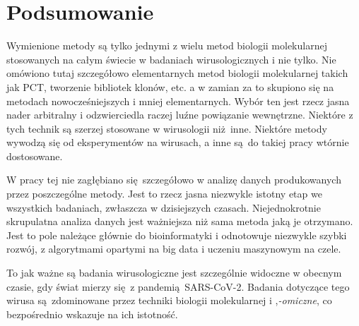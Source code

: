 \documentclass[two column, twoside, a4paper]{article}
\begin{document}
\section{Podsumowanie}

Wymienione metody są tylko jednymi z wielu metod biologii molekularnej stosowanych na całym świecie w badaniach wirusologicznych i nie tylko. Nie omówiono tutaj szczegółowo elementarnych metod biologii molekularnej takich jak PCT, tworzenie bibliotek klonów, etc. a w zamian za to skupiono się na metodach nowocześniejszych i mniej elementarnych. Wybór ten jest rzecz jasna nader arbitralny i odzwierciedla raczej luźne powiązanie wewnętrzne. Niektóre z tych technik są szerzej stosowane w wirusologii niż inne. Niektóre metody wywodzą się od eksperymentów na wirusach, a inne są do takiej pracy wtórnie dostosowane.

W pracy tej nie zagłębiano się szczegółowo w analizę danych produkowanych przez poszczególne metody. Jest to rzecz jasna niezwykle istotny etap we wszystkich badaniach, zwłaszcza w dzisiejszych czasach. Niejednokrotnie skrupulatna analiza danych jest ważniejsza niż sama metoda jaką je otrzymano. Jest to pole należące głównie do bioinformatyki i odnotowuje niezwykle szybki rozwój, z algorytmami opartymi na big data i uczeniu maszynowym na czele.

To jak ważne są badania wirusologiczne jest szczególnie widoczne w obecnym czasie, gdy świat mierzy się z pandemią SARS-CoV-2. Badania dotyczące tego wirusa są zdominowane przez techniki biologii molekularnej i ,\textit{-omiczne}, co bezpośrednio wskazuje na ich istotność.

\printbibliography
\end{document}
